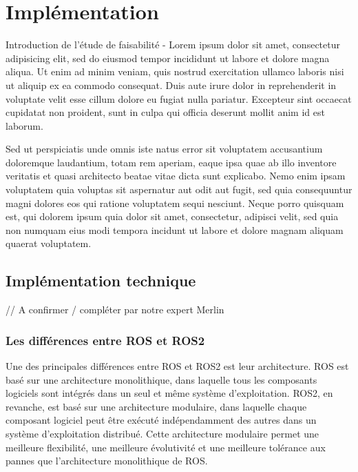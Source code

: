 	\chapter{Implémentation}

Introduction de l'étude de faisabilité - Lorem ipsum dolor sit amet, consectetur adipisicing elit, sed do eiusmod tempor incididunt ut labore et dolore magna aliqua. Ut enim ad minim veniam, quis nostrud exercitation ullamco laboris nisi ut aliquip ex ea commodo consequat. Duis aute irure dolor in reprehenderit in voluptate velit esse cillum dolore eu fugiat nulla pariatur. Excepteur sint occaecat cupidatat non proident, sunt in culpa qui officia deserunt mollit anim id est laborum.

	Sed ut perspiciatis unde omnis iste natus error sit voluptatem accusantium doloremque laudantium, totam rem aperiam, eaque ipsa quae ab illo inventore veritatis et quasi architecto beatae vitae dicta sunt explicabo. Nemo enim ipsam voluptatem quia voluptas sit aspernatur aut odit aut fugit, sed quia consequuntur magni dolores eos qui ratione voluptatem sequi nesciunt. Neque porro quisquam est, qui dolorem ipsum quia dolor sit amet, consectetur, adipisci velit, sed quia non numquam eius modi tempora incidunt ut labore et dolore magnam aliquam quaerat voluptatem.
	
		\section{Implémentation technique}

// A confirmer / compléter par notre expert Merlin

			\subsection{Les différences entre ROS et ROS2}

Une des principales différences entre ROS et ROS2 est leur architecture. ROS est basé sur une architecture monolithique, 
dans laquelle tous les composants logiciels sont intégrés dans un seul et même système d'exploitation. 
ROS2, en revanche, est basé sur une architecture modulaire, dans laquelle chaque composant logiciel peut être exécuté 
indépendamment des autres dans un système d'exploitation distribué. Cette architecture modulaire permet une meilleure flexibilité, 
une meilleure évolutivité et une meilleure tolérance aux pannes que l'architecture monolithique de ROS. 
\linebreak


